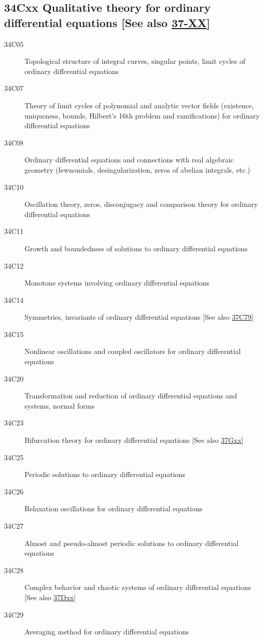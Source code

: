 \documentclass[letterpaper]{article}
\begin{document}
\subsection*{34Cxx  Qualitative theory for ordinary differential equations [See also \hyperref[37-XX]{37-XX}] }\label{34Cxx}
\begin{description}  
\item [34C05]\label{34C05} Topological structure of integral curves, singular points, limit cycles of ordinary differential equations
\item [34C07]\label{34C07} Theory of limit cycles of polynomial and analytic vector fields (existence, uniqueness, bounds, Hilbert's 16th problem and ramifications) for ordinary differential equations
\item [34C08]\label{34C08} Ordinary differential equations and connections with real algebraic geometry (fewnomials, desingularization, zeros of abelian integrals, etc.)
\item [34C10]\label{34C10} Oscillation theory, zeros, disconjugacy and comparison theory for ordinary differential equations
\item [34C11]\label{34C11} Growth and boundedness of solutions to ordinary differential equations
\item [34C12]\label{34C12} Monotone systems involving ordinary differential equations
\item [34C14]\label{34C14} Symmetries, invariants of ordinary differential equations [See also \hyperref[37C79]{37C79}]
\item [34C15]\label{34C15} Nonlinear oscillations and coupled oscillators for ordinary differential equations
\item [34C20]\label{34C20} Transformation and reduction of ordinary differential equations and systems, normal forms
\item [34C23]\label{34C23} Bifurcation theory for ordinary differential equations [See also \hyperref[37Gxx]{37Gxx}]
\item [34C25]\label{34C25} Periodic solutions to ordinary differential equations
\item [34C26]\label{34C26} Relaxation oscillations for ordinary differential equations
\item [34C27]\label{34C27} Almost and pseudo-almost periodic solutions to ordinary differential equations
\item [34C28]\label{34C28} Complex behavior and chaotic systems of ordinary differential equations [See also \hyperref[37Dxx]{37Dxx}]
\item [34C29]\label{34C29} Averaging method for ordinary differential equations

\end{description}
\end{document}
